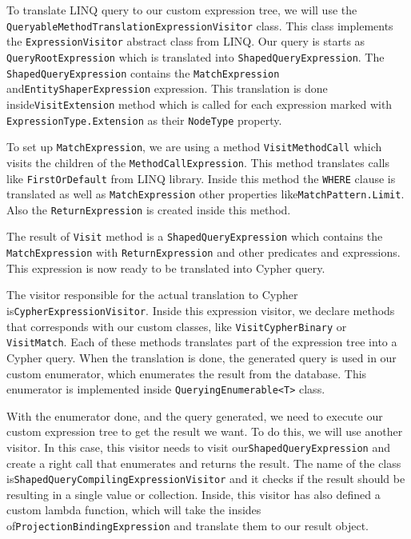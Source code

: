 To translate LINQ query to our custom expression tree, we will use the \texttt{QueryableMethodTranslationExpressionVisitor} class.
This class implements the \texttt{ExpressionVisitor} abstract class from LINQ. Our query is starts as \texttt{QueryRootExpression} which is
translated into \texttt{ShapedQueryExpression}. The \texttt{ShapedQueryExpression} contains the \texttt{MatchExpression} and\linebreak\texttt{EntityShaperExpression}
expression. This translation is done inside\linebreak\texttt{VisitExtension} method which is called for each expression marked with \texttt{ExpressionType.Extension}
as their \texttt{NodeType} property.

To set up \texttt{MatchExpression}, we are using a method \texttt{VisitMethodCall} which visits the children of the \texttt{MethodCallExpression}.
This method translates calls like \texttt{FirstOrDefault} from LINQ library. Inside this method the \texttt{WHERE} clause is translated as well
as \texttt{MatchExpression} other properties like\linebreak\texttt{MatchPattern.Limit}. Also the \texttt{ReturnExpression} is created inside this method.

The result of \texttt{Visit} method is a \texttt{ShapedQueryExpression} which contains the \texttt{MatchExpression}
with \texttt{ReturnExpression} and other predicates and expressions. This expression is now ready to be translated into Cypher query.

The visitor responsible for the actual translation to Cypher is\linebreak\texttt{CypherExpressionVisitor}. Inside this expression visitor,
we declare methods that corresponds with our custom classes, like \texttt{VisitCypherBinary} or \texttt{VisitMatch}. Each of these methods translates part of the expression
tree into a Cypher query. When the translation is done, the generated query is used in our custom enumerator, which enumerates the result from the database. This enumerator
is implemented inside \texttt{QueryingEnumerable<T>} class.

With the enumerator done, and the query generated, we need to execute our custom expression tree to get the result we want. To do this, we will use another visitor. In this case, this visitor needs to visit our\linebreak\texttt{ShapedQueryExpression} and create a right call that enumerates and returns the result.
The name of the class is\linebreak\texttt{ShapedQueryCompilingExpressionVisitor} and it checks if the result should be resulting in a single value or collection.
Inside, this visitor has also defined a custom lambda function, which will take the insides of\linebreak\texttt{ProjectionBindingExpression} and translate them to our result object.

